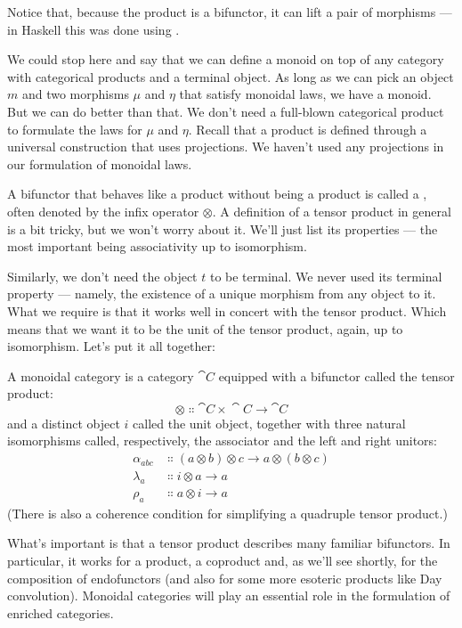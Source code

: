 \noindent
Notice that, because the product is a bifunctor, it can lift a pair of
morphisms --- in Haskell this was done using .

We could stop here and say that we can define a monoid on top of any
category with categorical products and a terminal object. As long as we
can pick an object $m$ and two morphisms $\mu$ and $\eta$ that satisfy
monoidal laws, we have a monoid. But we can do better than that. We
don't need a full-blown categorical product to formulate the laws for $\mu$
and $\eta$. Recall that a product is defined through a universal construction
that uses projections. We haven't used any projections in our
formulation of monoidal laws.

A bifunctor that behaves like a product without being a product is
called a , often denoted by the infix operator $\otimes$. A
definition of a tensor product in general is a bit tricky, but we won't
worry about it. We'll just list its properties --- the most important
being associativity up to isomorphism.

Similarly, we don't need the object $t$ to be terminal. We never
used its terminal property --- namely, the existence of a unique
morphism from any object to it. What we require is that it works well in
concert with the tensor product. Which means that we want it to be the
unit of the tensor product, again, up to isomorphism. Let's put it all
together:

A monoidal category is a category $\cat{C}$ equipped with a bifunctor
called the tensor product:
\[\otimes \Colon \cat{C}\times{}\cat{C} \to \cat{C}\]
and a distinct object $i$ called the unit object, together with
three natural isomorphisms called, respectively, the associator and the
left and right unitors:
\begin{align*}
\alpha_{a b c} &\Colon (a \otimes b) \otimes c \to a \otimes (b \otimes c) \\
\lambda_a &\Colon i \otimes a \to a \\
\rho_a &\Colon a \otimes i \to a
\end{align*}
(There is also a coherence condition for simplifying a quadruple tensor
product.)

What's important is that a tensor product describes many familiar
bifunctors. In particular, it works for a product, a coproduct and, as
we'll see shortly, for the composition of endofunctors (and also for
some more esoteric products like Day convolution). Monoidal categories
will play an essential role in the formulation of enriched categories.


